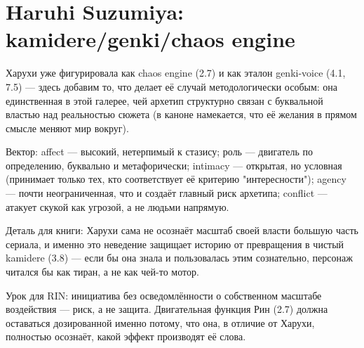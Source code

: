 \section{Haruhi Suzumiya: kamidere/genki/chaos engine}

Харухи уже фигурировала как chaos engine (2.7) и как эталон genki-voice (4.1, 7.5) — здесь добавим то, что делает её случай методологически особым: она единственная в этой галерее, чей архетип структурно связан с буквальной властью над реальностью сюжета (в каноне намекается, что её желания в прямом смысле меняют мир вокруг).

Вектор: affect — высокий, нетерпимый к стазису; роль — двигатель по определению, буквально и метафорически; intimacy — открытая, но условная (принимает только тех, кто соответствует её критерию "интересности"); agency — почти неограниченная, что и создаёт главный риск архетипа; conflict — атакует скукой как угрозой, а не людьми напрямую.

Деталь для книги: Харухи сама не осознаёт масштаб своей власти большую часть сериала, и именно это неведение защищает историю от превращения в чистый kamidere (3.8) — если бы она знала и пользовалась этим сознательно, персонаж читался бы как тиран, а не как чей-то мотор.

Урок для RIN: инициатива без осведомлённости о собственном масштабе воздействия — риск, а не защита. Двигательная функция Рин (2.7) должна оставаться дозированной именно потому, что она, в отличие от Харухи, полностью осознаёт, какой эффект производят её слова.
